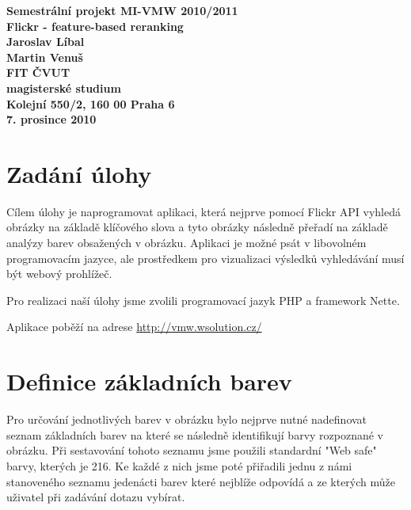 \documentclass[12pt]{article}
\author{Martin Venuš, Jaroslav Líbal}
\begin{document}

\begin{center}
\bf Semestrální projekt MI-VMW 2010/2011\\[5mm]
    Flickr - feature-based reranking\\[5mm]
       Jaroslav Líbal\\
       Martin Venuš\\[5mm]
FIT ČVUT\\[2mm]
magisterské studium\\[2mm]
Kolejní 550/2, 160 00 Praha 6\\[2mm]
7. prosince 2010
\end{center}

\newpage
\tableofcontents
\newpage
\pagestyle{fancy}

\section{Zadání úlohy}
Cílem úlohy je naprogramovat aplikaci, která nejprve pomocí Flickr API vyhledá obrázky na základě klíčového slova a tyto obrázky následně přeřadí na základě analýzy barev obsažených v obrázku. Aplikaci je možné psát v libovolném programovacím jazyce, ale prostředkem pro vizualizaci výsledků vyhledávání musí být webový prohlížeč.

Pro realizaci naší úlohy jsme zvolili programovací jazyk PHP a framework Nette.

Aplikace poběží na adrese \url{http://vmw.wsolution.cz/}


\section{Definice základních barev}
Pro určování jednotlivých barev v obrázku bylo nejprve nutné nadefinovat seznam základních barev na které se následně identifikují barvy rozpoznané v obrázku. Při sestavování tohoto seznamu jsme použili standardní "Web safe" barvy, kterých je 216. Ke každé z nich jsme poté přiřadili jednu z námi stanoveného seznamu jedenácti barev které nejblíže odpovídá a ze kterých může uživatel při zadávání dotazu vybírat.
\end{document}
